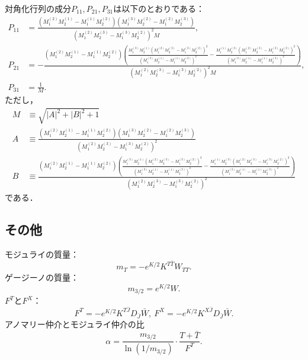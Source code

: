 \documentclass[a4paper,uplatex,dvipdfmx]{jsarticle}
\theoremstyle{definition}
\begin{document}
対角化行列の成分$P_{11},P_{21},P_{31}$は以下のとおりである：
\begin{align}
   P_{11}
   &=
   \frac{(M_{1}^{(2)} M_{2}^{(1)}-M_{1}^{(1)} M_{2}^{(2)}) \left( M_{1}^{(3)} M_{2}^{(2)}- M_{1}^{(2)} M_{2}^{(3)}\right)}{ (M_{1}^{(2)} M_{2}^{(3)}-M_{1}^{(3)} M_{2}^{(2)})^2 M}
   ,
   \\
   P_{21}
   &=
   -\frac{(M_{1}^{(2)} M_{2}^{(1)}-M_{1}^{(1)} M_{2}^{(2)}) \left(\frac{M_{1}^{(3)} M_{2}^{(1)} ( M_{1}^{(2)} M_{2}^{(3)}- M_{1}^{(3)} M_{2}^{(2)})^2}{(M_{1}^{(3)} M_{2}^{(1)}-M_{1}^{(1)} M_{2}^{(3)})^2}-\frac{M_{1}^{(1)} M_{2}^{(3)} ( M_{1}^{(2)} M_{2}^{(3)}- M_{1}^{(3)} M_{2}^{(2)})^2}{(M_{1}^{(3)} M_{2}^{(1)}-M_{1}^{(1)} M_{2}^{(3)})^2}\right)}{ (M_{1}^{(2)} M_{2}^{(3)}-M_{1}^{(3)} M_{2}^{(2)})^2 M}
   ,
   \\
   P_{31}
   &=
   \frac{1}{M}
   .
\end{align}
ただし，
\begin{align}
   M
   &\equiv
   \sqrt{\left| A\right| ^2+\left| B\right| ^2+1}
   \\
   A
   &\equiv
   \frac{(M_{1}^{(2)} M_{2}^{(1)}-M_{1}^{(1)} M_{2}^{(2)}) \left(M_{1}^{(3)} M_{2}^{(2)} -M_{1}^{(2)} M_{2}^{(3)} \right)}{(M_{1}^{(2)} M_{2}^{(3)}-M_{1}^{(3)} M_{2}^{(2)})^2 }
   \\
   B
   &\equiv
   \frac{(M_{1}^{(2)} M_{2}^{(1)}-M_{1}^{(1)} M_{2}^{(2)}) \left(\frac{M_{1}^{(3)} M_{2}^{(1)} (M_{1}^{(2)} M_{2}^{(3)} -M_{1}^{(3)} M_{2}^{(2)} )^2}{(M_{1}^{(3)} M_{2}^{(1)}-M_{1}^{(1)} M_{2}^{(3)})^2}-\frac{M_{1}^{(1)} M_{2}^{(3)} (M_{1}^{(2)} M_{2}^{(3)} -M_{1}^{(3)} M_{2}^{(2)} )^2}{(M_{1}^{(3)} M_{2}^{(1)}-M_{1}^{(1)} M_{2}^{(3)})^2}\right)}{(M_{1}^{(2)} M_{2}^{(3)}-M_{1}^{(3)} M_{2}^{(2)})^2 }
\end{align}
である．


\subsection{その他}

モジュライの質量：
\begin{equation}
   m_{T}
   =
   -
   e^{K/2}K^{T\bar{T}}W_{TT}
   .
\end{equation}
ゲージーノの質量：
\begin{equation}
   m_{3/2}
   =
   e^{K/2}W
   .
\end{equation}
$F^{T}$と$F^{X}$：
\begin{equation}
   F^{T}
   =
   -
   e^{K/2}K^{T\bar{J}}D_{\bar{J}}\bar{W}
   ,\ 
   F^{X}
   =
   -
   e^{K/2}K^{X\bar{J}}D_{\bar{J}}\bar{W}
   .   
\end{equation}
アノマリー仲介とモジュライ仲介の比\cite{Choi_PhenomenologyMixed_2005}
\begin{equation}
  \alpha
  =
  \frac{m_{3/2}}{\ln (1/m_{3/2})}\cdot\frac{T+\bar{T}}{F^{T}}
  .
\end{equation}
\end{document}
